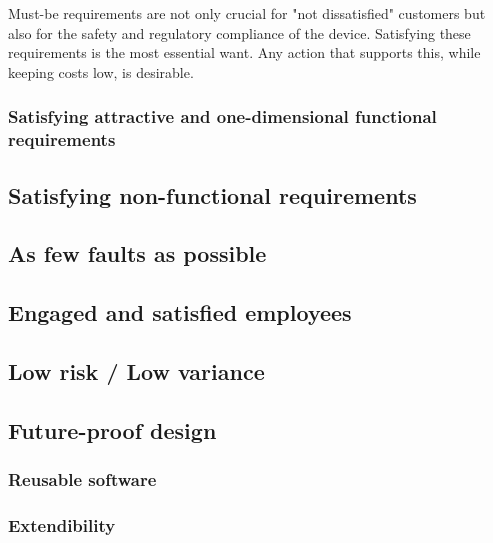 Must-be requirements are not only crucial for "not dissatisfied" customers but also for the safety and regulatory compliance of the device. Satisfying these requirements is the most essential want. Any action that supports this, while keeping costs low, is desirable.

\begin{comment}
In projects that consist purely of software, customer dissatisfaction is the only negative factor. Projects that also require custom hardware have an additional cost. The hardware already needs to implement every functionality and all manufactured devices need to support it. If the feature is then not implemented the hardware costs more without offering the benefits.
\end{comment}

\subsubsection{Satisfying attractive and one-dimensional functional requirements}

\subsection{Satisfying non-functional requirements}


\subsection{As few faults as possible}
\subsection{Engaged and satisfied employees}
\subsection{Low risk / Low variance}
\subsection{Future-proof design}
\subsubsection{Reusable software}
\subsubsection{Extendibility}
